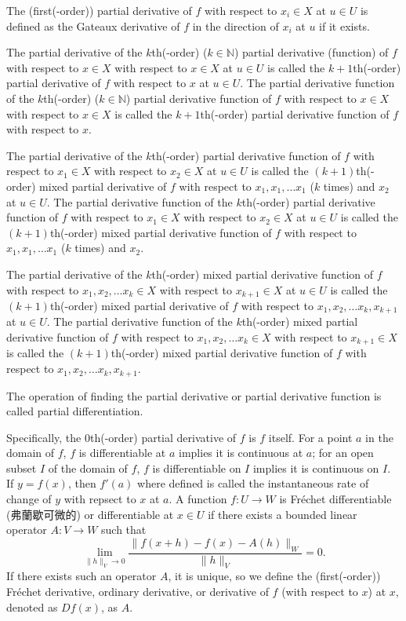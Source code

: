 \documentclass[a4paper,12pt]{report}
\begin{document}
\begin{itemize}
\begin{itemize}
The (first(-order)) partial derivative of $f$ with respect to $x_i\in X$ at $u\in U$ is defined as the Gateaux derivative of $f$ in the direction of $x_i$ at $u$ if it exists.

The partial derivative of the $k$th(-order) ($k\in\mathbb{N}$) partial derivative (function) of $f$ with respect to $ x \in X$ with respect to $ x \in X$ at $u\in U$ is called the $k+1$th(-order) partial derivative of $f$ with respect to $ x$ at $u\in U$. The partial derivative function of the $k$th(-order) ($k\in\mathbb{N}$) partial derivative function of $f$ with respect to $ x \in X$ with respect to $ x \in X$ is called the $k+1$th(-order) partial derivative function of $f$ with respect to $ x$.

The partial derivative of the $k$th(-order) partial derivative function of $f$ with respect to $ x_1\in X$ with respect to $ x_2\in X$ at $u\in U$ is called the $(k+1)$th(-order) mixed partial derivative of $f$ with respect to $ x_1, x_1,\dots  x_1$ ($k$ times) and $ x_2$ at $u\in U$. The partial derivative function of the $k$th(-order) partial derivative function of $f$ with respect to $ x_1\in X$ with respect to $ x_2\in X$ at $u\in U$ is called the $(k+1)$th(-order) mixed partial derivative function of $f$ with respect to $ x_1, x_1,\dots  x_1$ ($k$ times) and $ x_2$.

The partial derivative of the $k$th(-order) mixed partial derivative function of $f$ with respect to $ x_1, x_2,\dots  x_k\in X$ with respect to $ x_{k+1}\in X$ at $u\in U$ is called the $(k+1)$th(-order) mixed partial derivative of $f$ with respect to $ x_1, x_2,\dots  x_k, x_{k+1}$ at $u\in U$. The partial derivative function of the $k$th(-order) mixed partial derivative function of $f$ with respect to $ x_1, x_2,\dots  x_k\in X$ with respect to $ x_{k+1}\in X$ is called the $(k+1)$th(-order) mixed partial derivative function of $f$ with respect to $ x_1, x_2,\dots  x_k, x_{k+1}$.

The operation of finding the partial derivative or partial derivative function is called partial differentiation.

Specifically, the $0$th(-order) partial derivative of $f$ is $f$ itself.
For a point $a$ in the domain of $f$, $f$ is differentiable at $a$ implies it is continuous at $a$; for an open subset $I$ of the domain of $f$, $f$ is differentiable on $I$ implies it is continuous on $I$.
If $y=f(x)$, then $f'(a)$ where defined is called the instantaneous rate of change of $y$ with repsect to $x$ at $a$.
A function $f\colon U\to W$ is Fréchet differentiable (弗蘭歇可微的) or differentiable at $x\in U$ if there exists a bounded linear operator $A\colon V\to W$ such that
\[\lim_{\|h\|_V\to 0}\frac{\|f(x+h)-f(x)-A(h)\|_W}{\|h\|_V}=0.\]
If there exists such an operator $A$, it is unique, so we define the (first(-order)) Fréchet derivative, ordinary derivative, or derivative of $f$ (with respect to $x$) at $x$, denoted as $Df(x)$, as $A$.


\end{itemize}
\end{itemize}
\end{document}

